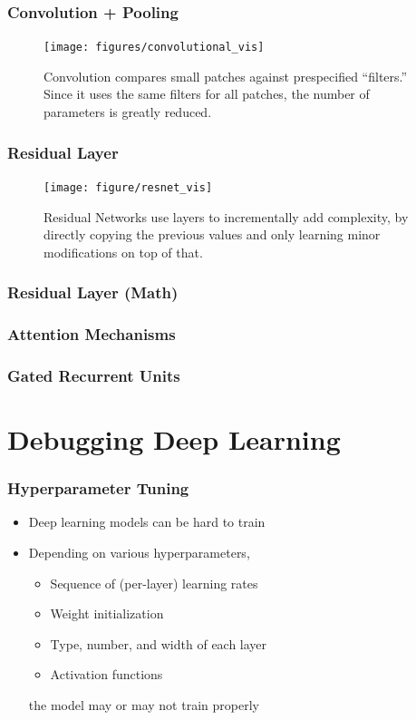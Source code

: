 \documentclass[10pt,mathserif]{beamer}
\begin{document}
\begin{frame}
  \frametitle{Convolution + Pooling}
  \begin{figure}
    \centering
    \texttt{[image: figures/convolutional\_vis]}
    \caption{Convolution compares small patches against prespecified
      ``filters.'' Since it uses the same filters for all patches, the number of
      parameters is greatly reduced.
      \label{fig:convolutional_vis}}
  \end{figure}
\end{frame}

\begin{frame}
  \frametitle{Residual Layer}
  \begin{figure}
      \centering
      \texttt{[image: figure/resnet\_vis]}
      \caption{Residual Networks use layers to incrementally 
        add complexity, by directly copying the previous values and only
        learning minor modifications on top of that. \label{fig:resnet_vis} }
  \end{figure}
\end{frame}

\begin{frame}
  \frametitle{Residual Layer (Math)}
\end{frame}

\begin{frame}
  \frametitle{Attention Mechanisms}
\end{frame}

\begin{frame}
  \frametitle{Gated Recurrent Units}
\end{frame}

\section{Debugging Deep Learning}

\begin{frame}
  \frametitle{Hyperparameter Tuning}
  \begin{itemize}
  \item Deep learning models can be hard to train
  \item Depending on various hyperparameters,
    \begin{itemize}
    \item Sequence of (per-layer) learning rates
    \item Weight initialization
    \item Type, number, and width of each layer
    \item Activation functions
    \end{itemize}
    the model may or may not train properly
  \end{itemize}
\end{frame}
\end{document}
